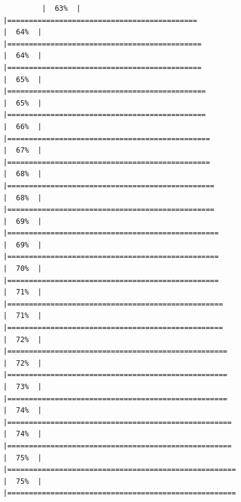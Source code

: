 \documentclass[
]{article}
\begin{document}
\begin{verbatim}
         |  63%  |                                                                              |============================================                          |  64%  |                                                                              |=============================================                         |  64%  |                                                                              |=============================================                         |  65%  |                                                                              |==============================================                        |  65%  |                                                                              |==============================================                        |  66%  |                                                                              |===============================================                       |  67%  |                                                                              |===============================================                       |  68%  |                                                                              |================================================                      |  68%  |                                                                              |================================================                      |  69%  |                                                                              |=================================================                     |  69%  |                                                                              |=================================================                     |  70%  |                                                                              |=================================================                     |  71%  |                                                                              |==================================================                    |  71%  |                                                                              |==================================================                    |  72%  |                                                                              |===================================================                   |  72%  |                                                                              |===================================================                   |  73%  |                                                                              |===================================================                   |  74%  |                                                                              |====================================================                  |  74%  |                                                                              |====================================================                  |  75%  |                                                                              |=====================================================                 |  75%  |                                                                              |=====================================================         
\end{verbatim}
\end{document}
